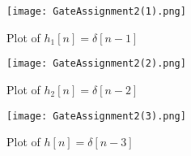 \documentclass[journal,12pt,twocolumn]{IEEEtran}
\begin{document}
\begin{figure}[!h]
 \centering
 \texttt{[image: GateAssignment2(1).png]}
 \caption{Plot of $h_1[n]=\delta[n-1]$}
 \label{plot}
\end{figure}
\begin{figure}[!h]
 \centering
 \texttt{[image: GateAssignment2(2).png]}
 \caption{Plot of $h_2[n]=\delta[n-2]$}
 \label{plot}
\end{figure}
\begin{figure}[!h]
 \centering
 \texttt{[image: GateAssignment2(3).png]}
 \caption{Plot of $h[n]=\delta[n-3]$}
 \label{plot}
\end{figure}
\end{document}
